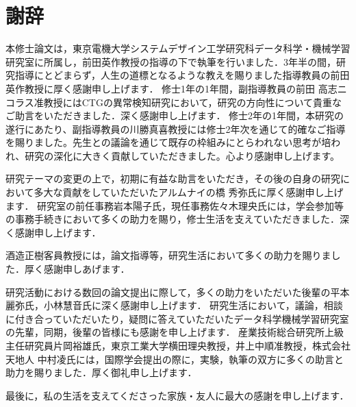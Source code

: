 \chapter*{謝辞}
本修士論文は，東京電機大学システムデザイン工学研究科データ科学・機械学習研究室に所属し，前田英作教授の指導の下で執筆を行いました．3年半の間，研究指導にとどまらず，人生の道標となるような教えを賜りました指導教員の前田英作教授に厚く感謝申し上げます．
修士1年の1年間，副指導教員の前田 高志ニコラス准教授にはCTGの異常検知研究において，研究の方向性について貴重なご助言をいただきました．深く感謝申し上げます．
修士2年の1年間，本研究の遂行にあたり、副指導教員の川勝真喜教授には修士2年次を通じて的確なご指導を賜りました。先生との議論を通じて既存の枠組みにとらわれない思考が培われ、研究の深化に大きく貢献していただきました。心より感謝申し上げます。

研究テーマの変更の上で，初期に有益な助言をいただき，その後の自身の研究において多大な貢献をしていただいたアルムナイの橋 秀弥氏に厚く感謝申し上げます．
研究室の前任事務岩本陽子氏，現任事務佐々木理央氏には，学会参加等の事務手続きにおいて多くの助力を賜り，修士生活を支えていただきました．深く感謝申し上げます．

酒造正樹客員教授には，論文指導等，研究生活において多くの助力を賜りました．厚く感謝申しあげます．

研究活動における数回の論文提出に際して，多くの助力をいただいた後輩の平本麗弥氏，小林慧音氏に深く感謝申し上げます．
研究生活において，議論，相談に付き合っていただいたり，疑問に答えていただいたデータ科学機械学習研究室の先輩，同期，後輩の皆様にも感謝を申し上げます．
産業技術総合研究所上級主任研究員片岡裕雄氏，東京工業大学横田理央教授，井上中順准教授，株式会社天地人 中村凌氏には，国際学会提出の際に，実験，執筆の双方に多くの助言と助力を賜りました．厚く御礼申し上げます．

最後に，私の生活を支えてくださった家族・友人に最大の感謝を申し上げます．

\newpage
